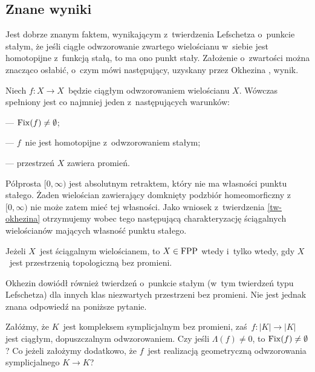 \subsection{Znane wyniki}\label{subsec-znane_wyniki_o_fpp_w_rayless_spaces}
Jest dobrze znanym faktem, wynikającym z~twierdzenia Lefschetza o~punkcie stałym, że jeśli ciągłe odwzorowanie zwartego wielościanu w~siebie jest homotopijne z~funkcją stałą, to ma ono punkt stały. Założenie o~zwartości można znacząco osłabić, o~czym mówi następujący, uzyskany przez Okhezina \cite{Okhezin95}, wynik.

\begin{tw}\label{tw-okhezina}
Niech $f\colon X\to X$~będzie ciągłym odwzorowaniem wielościanu $X$. Wówczas spełniony jest co najmniej jeden z~następujących warunków:
\begin{compactitem}
\item[---] $\operatorname{Fix}(f)\not=\emptyset$;
\item[---] $f$~nie jest homotopijne z~odwzorowaniem stałym;
\item[---] przestrzeń $X$ zawiera promień.
\end{compactitem}
\end{tw}

Półprosta $[0,\infty)$ jest absolutnym retraktem, który nie ma własności punktu stałego. Żaden wielościan zawierający domknięty podzbiór homeomorficzny z~$[0,\infty)$ nie może zatem mieć tej własności. Jako wniosek z~twierdzenia \ref{tw-okhezina} otrzymujemy wobec tego następującą charakteryzację ściągalnych wielościanów mających własność punktu stałego.

\begin{tw}\label{tw-okhezina-brouwera}
Jeżeli $X$~jest ściągalnym wielościanem, to $X\in\mathrm{FPP}$ wtedy i~tylko wtedy, gdy $X$~jest przestrzenią topologiczną bez promieni.
\end{tw}

Okhezin \cite{Okhezin95} dowiódł również twierdzeń o~punkcie stałym (w~tym twierdzeń typu Lefschetza) dla innych klas niezwartych przestrzeni bez promieni. Nie jest jednak znana odpowiedź na poniższe pytanie.

\begin{problem}\label{problem-twierdzenie_lefschetza_dla_przestrzeni_bez_promieni}
Załóżmy, że $K$~jest kompleksem symplicjalnym bez promieni, zaś~$f\colon |K|\to |K|$ jest ciągłym, dopuszczalnym odwzorowaniem. Czy jeśli \mbox{$\Lambda(f)\not=0$}, to $\operatorname{Fix}(f)\not=\emptyset$? Co jeżeli założymy dodatkowo, że $f$~jest realizacją geometryczną odwzorowania symplicjalnego $K\to K$?
\end{problem}

